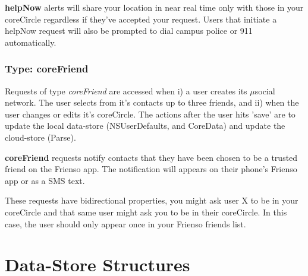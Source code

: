   \textbf{helpNow} alerts will share your location in near real time only with those
  in your coreCircle regardless if they've accepted your request.  Users that initiate 
  a helpNow request will also be prompted to dial campus police or 911 automatically.
   
\subsubsection{Type: coreFriend }
  Requests of type \emph{coreFriend} are accessed when i) a user creates its $\mu$social
  network.  The user selects from it's contacts up to three friends, and ii) when the user
  changes or edits it's coreCircle.  The actions after the user hits 'save' are to update
  the local data-store (NSUserDefaults, and CoreData) and update the cloud-store (Parse).
  
  \noindent \textbf{coreFriend} requests notify contacts that they have been chosen to be 
  a trusted friend on the Frienso app.  The notification will appears on their phone's 
  Frienso app or as a SMS text.  
  
  These requests have bidirectional properties, you might ask user X to be in your 
  coreCircle and that same user might ask you to be in their coreCircle.  In this case,
  the user should only appear once in your Frienso friends list.
  
%  
  
\section{Data-Store Structures}

